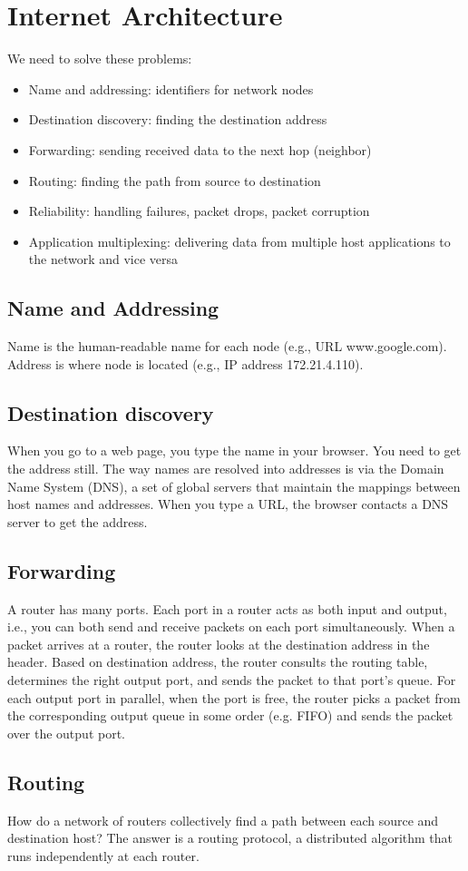 \section{Internet Architecture}

We need to solve these problems:
\begin{itemize}
    \item Name and addressing: identifiers for network nodes
    \item Destination discovery: finding the destination address
    \item Forwarding: sending received data to the next hop (neighbor)
    \item Routing: finding the path from source to destination
    \item Reliability: handling failures, packet drops, packet corruption
    \item Application multiplexing: delivering data from multiple host
          applications to the network and vice versa
\end{itemize}

\subsection{Name and Addressing}
Name is the human-readable name for each node (e.g., URL www.google.com).
Address is where node is located (e.g., IP address 172.21.4.110).

\subsection{Destination discovery}
When you go to a web page, you type the name in your browser. You
need to get the address still. The way names are resolved into
addresses is via the Domain Name System (DNS), a set of global
servers that maintain the mappings between host names and addresses.
When you type a URL, the browser contacts a DNS server to get the address.

\subsection{Forwarding}
A router has many ports. Each port in a router acts as both input
and output, i.e., you can both send and receive packets on each port
simultaneously.
When a packet arrives at a router, the router looks at the destination address
in the header. Based on destination address, the router consults the routing
table, determines the right output port, and sends the packet to that port's queue.
For each output port in parallel, when the port is free, the router picks
a packet from the corresponding output queue in some order (e.g. FIFO) and
sends the packet over the output port.

\subsection{Routing}
How do a network of routers collectively find a path between each
source and destination host? The answer is a routing protocol,
a distributed algorithm that runs independently at each router.